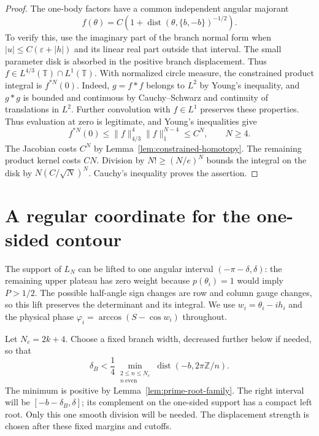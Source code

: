 \documentclass[11pt]{article}
\numberwithin{equation}{section}
\theoremstyle{remark}\newtheorem{remark}[theorem]{Remark}
\begin{document}
\begin{proof}
The one-body factors have a common independent angular majorant
\[
 f(\theta)=C\left(1+
  \operatorname{dist}(\theta,\{b,-b\})^{-1/2}\right).
\]
To verify this, use the imaginary part of the branch normal form
when $|u|\le C(\varepsilon+|h|)$ and its linear real part outside
that interval.  The small parameter disk is absorbed in the positive
branch displacement.  Thus $f\in L^{4/3}(\mathbb T)\cap L^1(\mathbb T)$.
With normalized circle measure, the constrained product integral is
$f^{*N}(0)$.  Indeed, $g=f*f$ belongs to $L^2$ by Young's
inequality, and $g*g$ is bounded and continuous by
Cauchy--Schwarz and continuity of translations in $L^2$.
Further convolution with $f\in L^1$ preserves these properties.
Thus evaluation at zero is legitimate, and Young's inequalities give
\[
 f^{*N}(0)\le \|f\|_{4/3}^{4}\|f\|_1^{N-4}\le C^N,
 \qquad N\ge4.
\]
The Jacobian costs $C^N$ by Lemma~\ref{lem:constrained-homotopy}.
The remaining product kernel costs $CN$.  Division by
$N!\ge(N/e)^N$ bounds the integral on the disk by
$N(C/\sqrt N)^N$.  Cauchy's inequality proves the assertion.
\end{proof}

\section{A regular coordinate for the one-sided contour}\label{sec:global-coordinate}


The support of $L_N$ can be lifted to one angular interval
$(-\pi-\delta,\delta)$: the remaining upper plateau has zero
weight because $p(\theta_i)=1$ would imply $P>1/2$.
The possible half-angle sign changes are row and column gauge
changes, so this lift preserves the determinant and its integral.
We use $w_i=\theta_i-ih_i$ and the physical phase
$\varphi_i=\arccos(S-\cos w_i)$ throughout.

Let $N_c=2k+4$. Choose a fixed branch width, decreased further
below if needed, so that
\begin{equation}\label{eq:finite-mean-exclusion}
 \delta_B<\frac14\min_{\substack{2\le n\le N_c\\n\ \mathrm{even}}}
       \operatorname{dist}(-b,2\pi\mathbb Z/n).
\end{equation}
The minimum is positive by Lemma~\ref{lem:prime-root-family}.
The right interval will be $[-b-\delta_B,\delta]$; its
complement on the one-sided support has a compact left root.
Only this one smooth division will be needed. The displacement
strength is chosen after these fixed margins and cutoffs.
\end{document}
